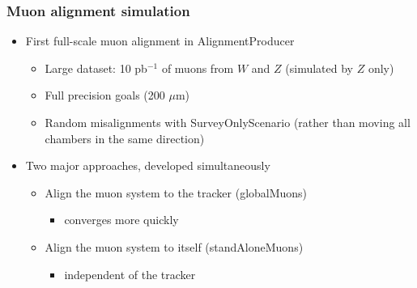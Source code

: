 \documentclass[compress]{beamer}
\begin{document}
\begin{frame}
\frametitle{Muon alignment simulation}
\begin{itemize}\setlength{\itemsep}{0.25 cm}
\item First full-scale muon alignment in AlignmentProducer

\begin{itemize}\setlength{\itemsep}{0.25 cm}
\item Large dataset: 10 pb$^{-1}$ of muons from $W$ and $Z$ (simulated by $Z$ only)
\item Full precision goals (200 $\mu$m)
\item Random misalignments with SurveyOnlyScenario (rather than moving all chambers in the same direction)
\end{itemize}

\item Two major approaches, developed simultaneously

\begin{itemize}\setlength{\itemsep}{0.25 cm}
\item Align the muon system to the tracker (globalMuons)
\begin{itemize}
\item converges more quickly
\end{itemize}

\item Align the muon system to itself (standAloneMuons)
\begin{itemize}
\item independent of the tracker
\end{itemize}
\end{itemize}
\end{itemize}
\end{frame}
\end{document}
